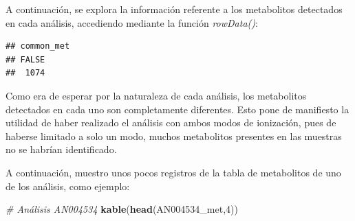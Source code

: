 \documentclass[
]{article}
\newenvironment{Shaded}{\begin{snugshade}}{\end{snugshade}}
\newcommand{\CommentTok}[1]{\textcolor[rgb]{0.56,0.35,0.01}{\textit{#1}}}
\newcommand{\DecValTok}[1]{\textcolor[rgb]{0.00,0.00,0.81}{#1}}
\newcommand{\FunctionTok}[1]{\textcolor[rgb]{0.13,0.29,0.53}{\textbf{#1}}}
\newcommand{\NormalTok}[1]{#1}
\newcommand{\OtherTok}[1]{\textcolor[rgb]{0.56,0.35,0.01}{#1}}
\newcommand{\SpecialCharTok}[1]{\textcolor[rgb]{0.81,0.36,0.00}{\textbf{#1}}}
\begin{document}
A continuación, se explora la información referente a los metabolitos
detectados en cada análisis, accediendo mediante la función
\emph{rowData()}:

\begin{Shaded}
\end{Shaded}

\begin{verbatim}
## common_met
## FALSE 
##  1074
\end{verbatim}

Como era de esperar por la naturaleza de cada análisis, los metabolitos
detectados en cada uno son completamente diferentes. Esto pone de
manifiesto la utilidad de haber realizado el análisis con ambos modos de
ionización, pues de haberse limitado a solo un modo, muchos metabolitos
presentes en las muestras no se habrían identificado.

A continuación, muestro unos pocos registros de la tabla de metabolitos
de uno de los análisis, como ejemplo:

\begin{Shaded}
\begin{Highlighting}[]
\CommentTok{\# Análisis AN004534}
\FunctionTok{kable}\NormalTok{(}\FunctionTok{head}\NormalTok{(AN004534\_met,}\DecValTok{4}\NormalTok{))}
\end{Highlighting}
\end{Shaded}
\end{document}

